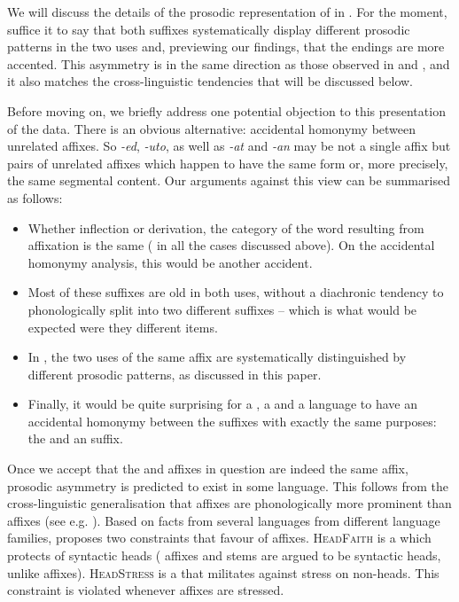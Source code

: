 \documentclass[output=paper, colorlinks, citecolor=brown, newtxmath]{langsci/langscibook}
\begin{document}
\noindent We will discuss the details of the prosodic representation of  in  . For the moment, suffice it to say that both suffixes systematically display different prosodic patterns in the two uses and, previewing our findings, that the  endings are more accented. This asymmetry is in the same direction as those observed in \citet{Mar2002} and \citet{Arsim2013}, and it also matches the cross-linguistic tendencies that will be discussed below.

Before moving on, we briefly address one potential objection to this presentation of the data. There is an obvious alternative: accidental homonymy between unrelated affixes. So  \textit{-ed},  \textit{-uto}, as well as  \textit{-at} and \textit{-an} may be not a single affix but pairs of unrelated affixes which happen to have the same form or, more precisely, the same segmental content. Our arguments against this view can be summarised as follows:
\begin{itemize}
  \item Whether inflection or derivation, the category of the word resulting from affixation is the same ( in all the cases discussed above). On the accidental homonymy analysis, this would be another accident.
  \item Most of these suffixes are old in both uses, without a diachronic tendency to phonologically split into two different suffixes – which is what would be expected were they different items.
  \item In , the two uses of the same affix are systematically distinguished by different prosodic patterns, as discussed in this paper.
  \item Finally, it would be quite surprising for a , a  and a  language to have an accidental homonymy between the suffixes with exactly the same purposes: the  and an  suffix.
  \end{itemize}

Once we accept that the  and  affixes in question are indeed the same affix, prosodic asymmetry is predicted to exist in some language. This follows from the cross-linguistic generalisation that  affixes are phonologically more prominent than  affixes (see e.g. \citealt{Bec1997, Revithiadou1999}). Based on facts from several languages from different language families, \citet{Revithiadou1999} proposes two constraints that favour  of  affixes. \textsc{HeadFaith} is a  which protects  of syntactic heads ( affixes and stems are argued to be syntactic heads, unlike  affixes). \textsc{HeadStress} is a  that militates against stress on non-heads. This constraint is violated whenever  affixes are stressed.
\end{document}
